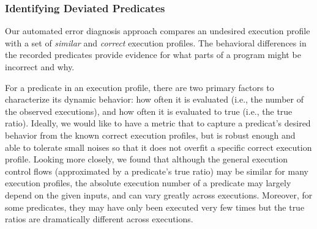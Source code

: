 


\subsubsection{Identifying Deviated Predicates}
\label{sec:deviation}


Our
automated error diagnosis approach compares an undesired execution profile with a set
of \textit{similar} and \textit{correct} execution profiles. 
The behavioral differences in the recorded predicates provide evidence for what parts of a program might be
incorrect and why. %

For a predicate in an execution profile,
there are two primary factors to
characterize its dynamic behavior: how often it is
evaluated (i.e., the number of the
observed executions), and how often it is evaluated to true (i.e., the true ratio).
Ideally, we would like to have a metric that
to capture a predicat's desired behavior
from the known correct execution profiles, but is robust enough and
able to tolerate small noises so that it does
not overfit a specific correct execution profile.
Looking more closely, we found that although
the general execution control flows (approximated by
a predicate's true ratio) may be similar for many 
execution profiles, the absolute execution
number of a predicate may largely depend on the given inputs, and
can vary greatly across executions. Moreover, for
some predicates, they may have
only been executed very few times but the true ratios
are dramatically different across executions.




